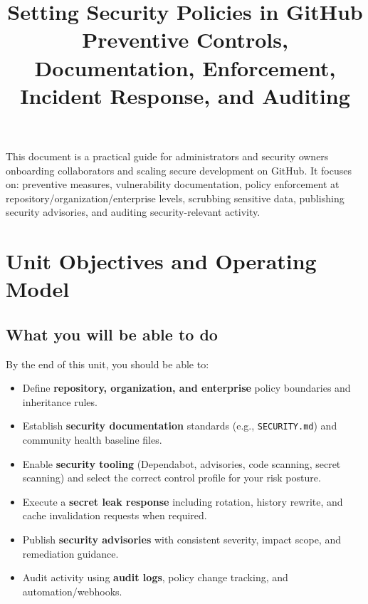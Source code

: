 \documentclass[11pt]{article}
\title{\textbf{Setting Security Policies in GitHub}\\
\large Preventive Controls, Documentation, Enforcement, Incident Response, and Auditing}
\author{}
\date{}
\newcommand{\gh}{\textsf{GitHub}}
\begin{document}
\maketitle
\vspace{-1.0em}

\begin{notebox}
This document is a practical guide for administrators and security owners onboarding collaborators and scaling secure development on \gh. It focuses on: preventive measures, vulnerability documentation, policy enforcement at repository/organization/enterprise levels, scrubbing sensitive data, publishing security advisories, and auditing security-relevant activity.
\end{notebox}

\tableofcontents
\newpage

\section{Unit Objectives and Operating Model}

\subsection{What you will be able to do}
By the end of this unit, you should be able to:

\begin{itemize}[leftmargin=*,itemsep=2pt]
  \item Define \textbf{repository, organization, and enterprise} policy boundaries and inheritance rules.
  \item Establish \textbf{security documentation} standards (e.g., \texttt{SECURITY.md}) and community health baseline files.
  \item Enable \textbf{security tooling} (Dependabot, advisories, code scanning, secret scanning) and select the correct control profile for your risk posture.
  \item Execute a \textbf{secret leak response} including rotation, history rewrite, and cache invalidation requests when required.
  \item Publish \textbf{security advisories} with consistent severity, impact scope, and remediation guidance.
  \item Audit activity using \textbf{audit logs}, policy change tracking, and automation/webhooks.
\end{itemize}
\end{document}
